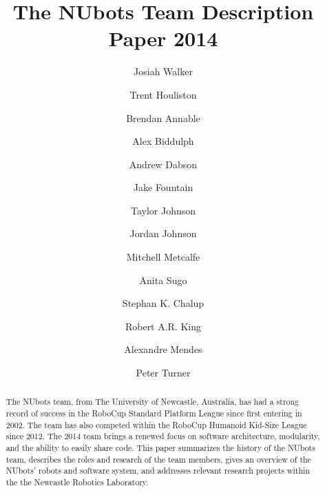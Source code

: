 \documentclass{llncs}
\begin{document}
%

\frontmatter          %
%
\pagestyle{headings}  %
%
%
\mainmatter              %
%
\title{The NUbots Team Description Paper 2014}
%

\author{Josiah Walker
		\and Trent Houliston
		\and Brendan Annable
		\and Alex Biddulph
		\and Andrew Dabson
		\and Jake Fountain
		\and Taylor Johnson
		\and Jordan Johnson
		\and Mitchell Metcalfe
		\and Anita Sugo
		\and Stephan K. Chalup
		\and Robert A.R. King
		\and Alexandre Mendes
		\and Peter Turner}
%
%

%
%

\maketitle              %

\begin{abstract}
The NUbots team, from The University of Newcastle, Australia, has had a strong record of success in the RoboCup Standard Platform League since first entering in 2002. The team has also competed within the RoboCup Humanoid Kid-Size League since 2012. The 2014 team brings a renewed focus on software architecture, modularity, and the ability to easily share code. This paper summarizes the history of the NUbots team, describes the roles and research of the team members, gives an overview of the NUbots' robots and software system, and addresses relevant research projects within the the Newcastle Robotics Laboratory.
\end{abstract}
\end{document}
